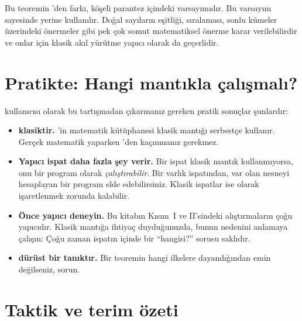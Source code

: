 
\noindent Bu teoremin 'den farkı, köşeli
parantez içindeki \lc{[Decidable P]} varsayımıdır. Bu varsayım
sayesinde  yerine  kullanılır. Doğal
sayıların eşitliği, sıralaması, sonlu kümeler üzerindeki önermeler gibi
pek çok somut matematiksel önerme karar verilebilirdir ve onlar için
klasik akıl yürütme yapıcı olarak da geçerlidir.

\section{Pratikte: Hangi mantıkla çalışmalı?}\label{sec:pratikte}

\Lean{} kullanıcısı olarak bu tartışmadan çıkarmanız gereken pratik
sonuçlar şunlardır:

\begin{itemize}
  \item \textbf{\Mathlib{} klasiktir.} \Lean{}'in matematik kütüphanesi
        klasik mantığı serbestçe kullanır. Gerçek matematik yaparken
        'den kaçınmanız gerekmez.
  \item \textbf{Yapıcı ispat daha fazla şey verir.} Bir ispat klasik
        mantık kullanmıyorsa, \Lean{} onu bir program olarak
        \emph{çalıştırabilir}. Bir varlık ispatından, var olan nesneyi
        hesaplayan bir program elde edebilirsiniz. Klasik ispatlar ise
         olarak işaretlenmek zorunda kalabilir.
  \item \textbf{Önce yapıcı deneyin.} Bu kitabın Kısım~I ve II'sindeki
        alıştırmaların çoğu yapıcıdır. Klasik mantığa ihtiyaç
        duyduğunuzda, bunun nedenini anlamaya çalışın: Çoğu zaman
        ispatın içinde bir ``hangisi?'' sorusu saklıdır.
  \item \textbf{ dürüst bir tanıktır.} Bir teoremin
        hangi ilkelere dayandığından emin değilseniz, sorun.
\end{itemize}

\section{Taktik ve terim özeti}


